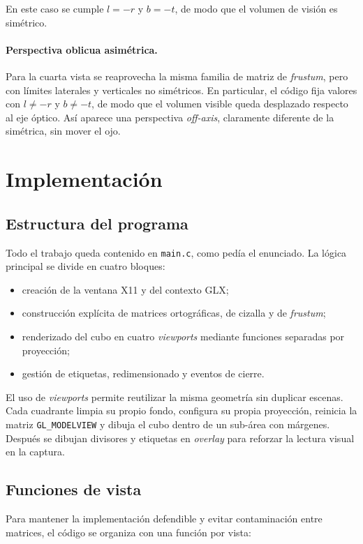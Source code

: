\documentclass[12pt,a4paper]{article}
\begin{document}
En este caso se cumple $l = -r$ y $b = -t$, de modo que el volumen de visión es simétrico.

\paragraph{Perspectiva oblicua asimétrica.}
Para la cuarta vista se reaprovecha la misma familia de matriz de \emph{frustum}, pero con límites laterales y verticales no simétricos. En particular, el código fija valores con $l \neq -r$ y $b \neq -t$, de modo que el volumen visible queda desplazado respecto al eje óptico. Así aparece una perspectiva \emph{off-axis}, claramente diferente de la simétrica, sin mover el ojo.

\section{Implementación}
\subsection{Estructura del programa}
Todo el trabajo queda contenido en \texttt{main.c}, como pedía el enunciado. La lógica principal se divide en cuatro bloques:

\begin{itemize}[leftmargin=*]
    \item creación de la ventana X11 y del contexto GLX;
    \item construcción explícita de matrices ortográficas, de cizalla y de \emph{frustum};
    \item renderizado del cubo en cuatro \emph{viewports} mediante funciones separadas por proyección;
    \item gestión de etiquetas, redimensionado y eventos de cierre.
\end{itemize}

El uso de \emph{viewports} permite reutilizar la misma geometría sin duplicar escenas. Cada cuadrante limpia su propio fondo, configura su propia proyección, reinicia la matriz \texttt{GL\_MODELVIEW} y dibuja el cubo dentro de un sub-área con márgenes. Después se dibujan divisores y etiquetas en \emph{overlay} para reforzar la lectura visual en la captura.

\subsection{Funciones de vista}
Para mantener la implementación defendible y evitar contaminación entre matrices, el código se organiza con una función por vista:
\end{document}
